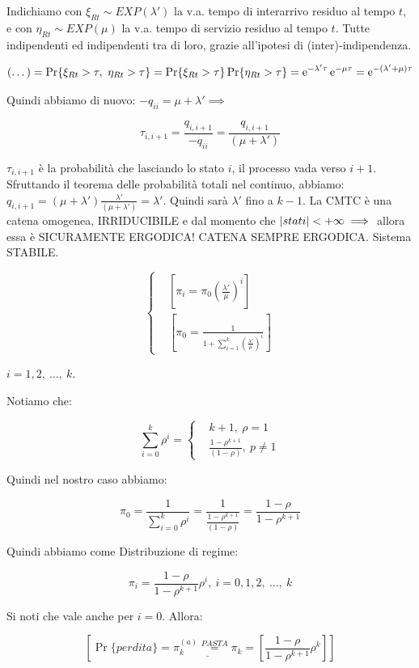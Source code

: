 \begin{itemize}
Indichiamo con $\xi_{Rt} \sim EXP(\lambda')$ la v.a. tempo di interarrivo residuo al tempo $t$, e con $\eta_{Rt} \sim EXP(\mu)$ la v.a. tempo di servizio residuo al tempo $t$. Tutte indipendenti ed indipendenti tra di loro, grazie all'ipotesi di (inter)-indipendenza. 

\[
	(\dots) = \Pr\{\xi_{Rt}>\tau,\ \eta_{Rt}>\tau\} = \Pr\{\xi_{Rt}>\tau\}\Pr\{\eta_{Rt}>\tau\} = \e^{-\lambda'\tau}\e^{-\mu\tau} = \e^{-(\lambda'+\mu)\tau}
\]

Quindi abbiamo di nuovo: $-q_{ii} = \mu+\lambda' \implies$

\[
	\tau_{i,i+1} = \frac{q_{i,i+1}}{-q_{ii}} = \frac{q_{i,i+1}}{(\mu+\lambda')}
\]

$\tau_{i,i+1}$ è la probabilità che lasciando lo stato $i$, il processo vada verso $i+1$. Sfruttando il teorema delle probabilità totali nel continuo, abbiamo: $q_{i,i+1} = (\mu+\lambda') \frac{\lambda'}{(\mu+\lambda')} = \lambda'$. Quindi sarà $\lambda'$ fino a $k-1$. La CMTC è una catena omogenea, IRRIDUCIBILE e dal momento che $\left\vert{stati}\right\vert<+\infty \implies$ allora essa è SICURAMENTE ERGODICA! CATENA SEMPRE ERGODICA. Sistema STABILE.

\[
	\left\{
	\begin{aligned}
	&[\pi_i = \pi_0(\frac{\lambda'}{\mu})^i]\\
	&[\pi_0 = \frac{1}{1+\sum_{i=1}^k{(\frac{\lambda'}{\mu})^i}}]
	\end{aligned}
	\right.
\]

$i=1,2,\ \dots,\ k$.

Notiamo che:

\[
	\sum_{i=0}^k{\rho^i} = \left\{
	\begin{aligned}
	&k+1,\ \rho=1\\
	&\frac{1-\rho^{k+1}}{(1-\rho)},\ p\neq 1
	\end{aligned}
	\right.
\]

Quindi nel nostro caso abbiamo:

\[
	\pi_0 = \frac{1}{\sum_{i=0}^k{\rho^i}} = \frac{1}{\frac{1-\rho^{k+1}}{(1-\rho)}} = \frac{1-\rho}{1-\rho^{k+1}}
\]

Quindi abbiamo come Distribuzione di regime:

\[
	\pi_i = \frac{1-\rho}{1-\rho^{k+1}} \rho^i,\ i=0,1,2,\ \dots,\ k
\]

Si noti che vale anche per $i=0$. Allora:

\[
	[\Pr\{perdita\} = \underline{\pi_k^{(a)} \stackrel{PASTA}{=} \pi_k} = [\frac{1-\rho}{1-\rho^{k+1}} \rho^k]]
\]


\end{itemize}
